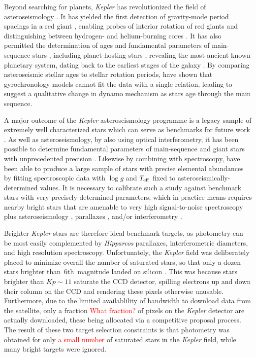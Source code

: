 \documentclass[a4paper,fleqn,usenatbib]{mnras}
\newcommand{\teff}{\mbox{$T_{\rm eff}$}\xspace}
\newcommand{\logg}{\mbox{$\log g$}\xspace}
\newcommand{\kepler}{\emph{Kepler}\xspace}
\newcommand{\hipparcos}{\emph{Hipparcos}\xspace}
\begin{document}
Beyond searching for planets, \kepler has revolutionized the field of asteroseismology \citep{2010PASP..122..131G}. It has yielded the first detection of gravity-mode period spacings in a red giant \citep{rggmodes}, enabling probes of interior rotation of red giants \citep{rggmoderotation} and distinguishing between hydrogen- and helium-burning cores \citep{rggmodehelium}. It has also permitted the determination of ages and fundamental parameters of main-sequence stars \citep{silvaages}, including planet-hosting stars \citep{huberplanetages,silvaplanetages}, revealing the most ancient known planetary system, dating back to the earliest stages of the galaxy \citep{ancientplanets}. By comparing asteroseismic stellar ages to stellar rotation periods, \citet{angusgyro} have shown that gyrochronology models cannot fit the data with a single relation, leading \citet{vansadersgyro} to suggest a qualitative change in dynamo mechanism as stars age through the main sequence. \newpage

A major outcome of the \kepler asteroseismology programme is a legacy sample of extremely well characterized stars which can serve as benchmarks for future work \citep{keplerlegacy1,keplerlegacy2}. As well as asteroseismology, by also using optical interferometry, it has been possible to determine fundamental parameters of main-sequence and giant stars with unprecedented precision \citep{huber12,thetacygwhite,white15}. Likewise by combining with spectroscopy, \citet{hawkinsapogee} have been able to produce a large sample of stars with precise elemental abundances by fitting spectroscopic data with \logg and \teff fixed to asteroseismically-determined values. It is necessary to calibrate such a study against benchmark stars with very precisely-determined parameters, which in practice means requires nearby bright stars that are amenable to very high signal-to-noise spectroscopy plus asteroseismology \citep{creeveybenchmark},  parallaxes \citep{hawkinsbenchmarks}, and/or interferometry \citep{casagrandebenchmark,creeveybenchmark2}. 

Brighter \kepler stars are therefore ideal benchmark targets, as photometry can be most easily complemented by \hipparcos parallaxes, interferometric diameters, and high resolution spectroscopy.  
Unfortunately, the \kepler field was deliberately placed to minimize overall the number of saturated stars, so that only a dozen stars brighter than~6th~magnitude landed on silicon \citep{2010ApJ...713L..79K}. This was because stars brighter than $Kp \sim 11$ saturate the CCD detector, spilling electrons up and down their column on the CCD and rendering these pixels otherwise unusable. Furthermore, due to the limited availablility of bandwidth to download data from the satellite, only a fraction \textcolor{red}{What fraction?} of pixels on the \kepler detector are actually downloaded, these being allocated via a competitive proposal process. The result of these two target selection constraints is that photometry was obtained for only \textcolor{red}{a small number} of saturated stars in the \kepler field, while many bright targets were ignored. 
\end{document}
